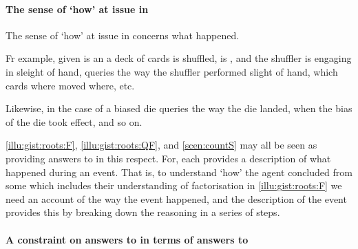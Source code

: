 \paragraph*{The sense of `how' at issue in \qHow{}}


\begin{note}
  The sense of `how' at issue in \qHow{} concerns what happened.

  Fr example, given is an  a deck of cards is shuffled, \mainCard{} is \mainCardPos{}, and the shuffler is engaging in sleight of hand, \qHow{} queries the way the shuffler performed slight of hand, which cards where moved where, etc.

  Likewise, in the case of a biased die \qHow{} queries the way the die landed, when the bias of the die took effect, and so on.

   \ref{illu:gist:roots:F}, \ref{illu:gist:roots:QF}, and \ref{scen:countS} may all be seen as providing answers to \qHow{} in this respect.
  For, each \scen{} provides a description of what happened during an event.
  That is, to understand `how' the agent concluded  from some \pool{} which includes their understanding of factorisation in \autoref{illu:gist:roots:F} we need an account of the way the event happened, and the description of the event provides this by breaking down the \agents{} reasoning in a series of steps.
\end{note}



\paragraph*{A constraint on answers to \qWhy{} in terms of answers to \qHow{}}


